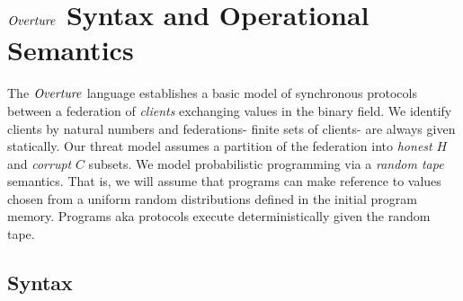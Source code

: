 \section{$\mathit{Overture}$ Syntax and Operational Semantics}

The $\mathit{Overture}$ language establishes a basic model of synchronous
protocols between a federation of \emph{clients} exchanging values in
the binary field. We identify clients by natural numbers and federations- finite sets of
clients- are always given statically.  Our threat model assumes a
partition of the federation into \emph{honest} $H$ and \emph{corrupt}
$C$ subsets. We model probabilistic programming via a \emph{random
tape} semantics. That is, we will assume that programs can make
reference to values chosen from a uniform random distributions defined
in the initial program memory.  Programs aka protocols execute
deterministically given the random tape.

\subsection{Syntax}

\minicatsyntaxfig

